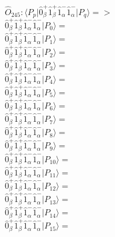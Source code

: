 \documentclass[14pt]{article}
\begin{document}
    $\hat{O}_{245}:  \langle{P_p}\vert \hat{0}_{\beta}^{+}\hat{1}_{\beta}^{+}\hat{1}_{\alpha}^{-}\hat{1}_{\alpha}^{-} \vert{P_q}\rangle => $ \\ 
    $ \hat{0}_{\beta}^{+}\hat{1}_{\beta}^{+}\hat{1}_{\alpha}^{-}\hat{1}_{\alpha}^{-} \vert{P_{0}}\rangle =  $ \\ 
    $ \hat{0}_{\beta}^{+}\hat{1}_{\beta}^{+}\hat{1}_{\alpha}^{-}\hat{1}_{\alpha}^{-} \vert{P_{1}}\rangle =  $ \\ 
    $ \hat{0}_{\beta}^{+}\hat{1}_{\beta}^{+}\hat{1}_{\alpha}^{-}\hat{1}_{\alpha}^{-} \vert{P_{2}}\rangle =  $ \\ 
    $ \hat{0}_{\beta}^{+}\hat{1}_{\beta}^{+}\hat{1}_{\alpha}^{-}\hat{1}_{\alpha}^{-} \vert{P_{3}}\rangle =  $ \\ 
    $ \hat{0}_{\beta}^{+}\hat{1}_{\beta}^{+}\hat{1}_{\alpha}^{-}\hat{1}_{\alpha}^{-} \vert{P_{4}}\rangle =  $ \\ 
    $ \hat{0}_{\beta}^{+}\hat{1}_{\beta}^{+}\hat{1}_{\alpha}^{-}\hat{1}_{\alpha}^{-} \vert{P_{5}}\rangle =  $ \\ 
    $ \hat{0}_{\beta}^{+}\hat{1}_{\beta}^{+}\hat{1}_{\alpha}^{-}\hat{1}_{\alpha}^{-} \vert{P_{6}}\rangle =  $ \\ 
    $ \hat{0}_{\beta}^{+}\hat{1}_{\beta}^{+}\hat{1}_{\alpha}^{-}\hat{1}_{\alpha}^{-} \vert{P_{7}}\rangle =  $ \\ 
    $ \hat{0}_{\beta}^{+}\hat{1}_{\beta}^{+}\hat{1}_{\alpha}^{-}\hat{1}_{\alpha}^{-} \vert{P_{8}}\rangle =  $ \\ 
    $ \hat{0}_{\beta}^{+}\hat{1}_{\beta}^{+}\hat{1}_{\alpha}^{-}\hat{1}_{\alpha}^{-} \vert{P_{9}}\rangle =  $ \\ 
    $ \hat{0}_{\beta}^{+}\hat{1}_{\beta}^{+}\hat{1}_{\alpha}^{-}\hat{1}_{\alpha}^{-} \vert{P_{10}}\rangle =  $ \\ 
    $ \hat{0}_{\beta}^{+}\hat{1}_{\beta}^{+}\hat{1}_{\alpha}^{-}\hat{1}_{\alpha}^{-} \vert{P_{11}}\rangle =  $ \\ 
    $ \hat{0}_{\beta}^{+}\hat{1}_{\beta}^{+}\hat{1}_{\alpha}^{-}\hat{1}_{\alpha}^{-} \vert{P_{12}}\rangle =  $ \\ 
    $ \hat{0}_{\beta}^{+}\hat{1}_{\beta}^{+}\hat{1}_{\alpha}^{-}\hat{1}_{\alpha}^{-} \vert{P_{13}}\rangle =  $ \\ 
    $ \hat{0}_{\beta}^{+}\hat{1}_{\beta}^{+}\hat{1}_{\alpha}^{-}\hat{1}_{\alpha}^{-} \vert{P_{14}}\rangle =  $ \\ 
    $ \hat{0}_{\beta}^{+}\hat{1}_{\beta}^{+}\hat{1}_{\alpha}^{-}\hat{1}_{\alpha}^{-} \vert{P_{15}}\rangle =  $ \\ 
    
\end{document}
